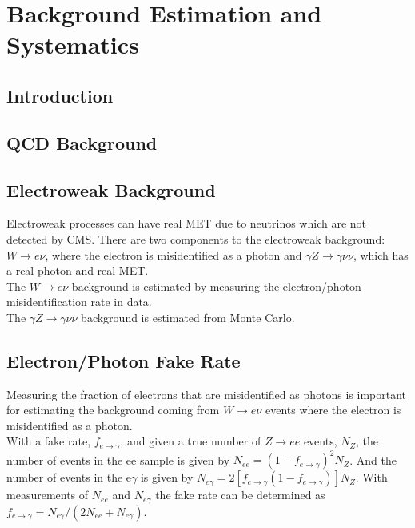 \chapter{Background Estimation and Systematics}

\section{Introduction}

\section{QCD Background}

\section{Electroweak Background}

Electroweak processes can have real MET due to neutrinos which are not
detected by CMS. There are two components to the electroweak background:
$W\rightarrow e\nu$, where the electron is misidentified as a photon and 
$\gamma Z\rightarrow\gamma\nu\nu$, which has a real photon and real MET. \\

The $W\rightarrow e\nu$ background is estimated by measuring the electron/photon
misidentification rate in data. \\

The $\gamma Z\rightarrow\gamma\nu\nu$ background is estimated from Monte Carlo.

\section{Electron/Photon Fake Rate}

Measuring the fraction of electrons that are misidentified as photons is
important for estimating the background coming from $W\rightarrow e\nu$ events
where the electron is misidentified as a photon. \\

With a fake rate, $f_{e\rightarrow\gamma}$, and given a true number of
$Z\rightarrow ee$ events, $N_{Z}$, the number of events in the ee sample is
given by $N_{ee} = (1 - f_{e\rightarrow\gamma})^{2}N_{Z}$. And the number of
events in the e$\gamma$ is given by $N_{e\gamma} = 2[f_{e\rightarrow\gamma}(1 -
f_{e\rightarrow\gamma})]N_{Z}$. With measurements of $N_{ee}$ and $N_{e\gamma}$
the fake rate can be determined as $f_{e\rightarrow\gamma} =
N_{e\gamma}/(2N_{ee} + N_{e\gamma})$. \\

